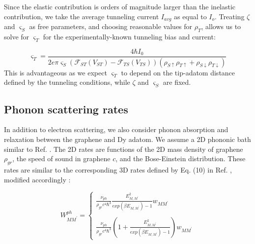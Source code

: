 \documentclass[reprint,amsmath,amssymb,aps,nofootinbib,onecolumn]{revtex4-2}
\begin{document}
Since the elastic contribution is orders of magnitude larger than the inelastic contribution, we take the average tunneling current $I_{avg}$ as equal to $I_{o}$. Treating $\zeta$ and $\varsigma_{S}$ as free parameters, and choosing reasonable values for $\rho_T$, allows us to solve for $\varsigma_{T}$ for the experimentally-known tunneling bias and current:

\begin{equation}
\varsigma_{T} =  \dfrac{4 \hbar I_0}{2 e \pi \varsigma_{S} \left( \mathcal{F}_{ST}(V_{ST})-\mathcal{F}_{TS}(V_{TS}) \right)\left( \rho_{S \uparrow} \rho_{T\uparrow} + \rho_{S \downarrow} \rho_{T\downarrow} \right)}
\label{eq:sigmaT}
\end{equation} 
This is advantageous as we expect $\varsigma_{T}$ to depend on the tip-adatom distance defined by the tunneling conditions, while $\zeta$ and $\varsigma_{S}$ are fixed.  

\subsection{Phonon scattering rates}
\label{phonon}
In addition to electron scattering, we also consider phonon absorption and relaxation between the graphene and Dy adatom. We assume a 2D phononic bath similar to Ref. \cite{cervetti2016}. The 2D rates are functions of the 2D mass density of graphene $\rho_{gr}$, the speed of sound in graphene $c$, and the Bose-Einstein distribution. These rates are similar to the corresponding 3D rates defined by Eq. (10) in Ref. \cite{politi_tunneling_1995}, modified accordingly \cite{cervetti2016}: 

\begin{equation}
    W_{MM^{\prime}}^{ph} =
    \begin{cases}
        \displaystyle
        \frac{ \nu_{ph}}{\rho_{gr} c^4 \hbar^3} \frac{E_{M,M^{\prime}}^2}{exp(\beta E_{M,M^{\prime}}) - 1} w_{MM^{\prime}}\\
        \\
        \displaystyle
         \frac{ \nu_{ph}}{\rho_{gr} c^4 \hbar^3} \left( 1 + \frac{E_{M,M^{\prime}}^2}{exp(\beta E_{M,M^{\prime}}) - 1}\right) w_{MM^{\prime}}
    \end{cases}
\label{eq:phonon_rates}    
\end{equation}

\end{document}
